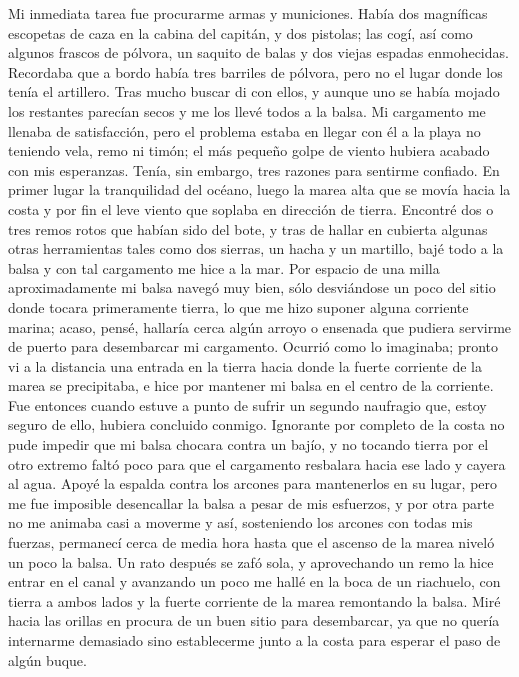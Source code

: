 \documentclass{novela}
\begin{document}
    Mi inmediata tarea fue procurarme armas y municiones. Había dos magníficas escopetas de caza en la cabina del capitán, y dos pistolas; las cogí, así como algunos frascos de pólvora, un saquito de balas y dos viejas espadas enmohecidas. Recordaba que a bordo había tres barriles de pólvora, pero no el lugar donde los tenía el artillero. Tras mucho buscar di con ellos, y aunque uno se había mojado los restantes parecían secos y me los llevé todos a la balsa. Mi cargamento me llenaba de satisfacción, pero el problema estaba en llegar con él a la playa no teniendo vela, remo ni timón; el más pequeño golpe de viento hubiera acabado con mis esperanzas. Tenía, sin embargo, tres razones para sentirme confiado. En primer lugar la tranquilidad del océano, luego la marea alta que se movía hacia la costa y por fin el leve viento que soplaba en dirección de tierra. Encontré dos o tres remos rotos que habían sido del bote, y tras de hallar en cubierta algunas otras herramientas tales como dos sierras, un hacha y un martillo, bajé todo a la balsa y con tal cargamento me hice a la mar. Por espacio de una milla aproximadamente mi balsa navegó muy bien, sólo desviándose un poco del sitio donde tocara primeramente tierra, lo que me hizo suponer alguna corriente marina; acaso, pensé, hallaría cerca algún arroyo o ensenada que pudiera servirme de puerto para desembarcar mi cargamento.
    Ocurrió como lo imaginaba; pronto vi a la distancia una entrada en la tierra hacia donde la fuerte corriente de la marea se precipitaba, e hice por mantener mi balsa en el centro de la corriente. Fue entonces cuando estuve a punto de sufrir un segundo naufragio que, estoy seguro de ello, hubiera concluido conmigo. Ignorante por completo de la costa no pude impedir que mi balsa chocara contra un bajío, y no tocando tierra por el otro extremo faltó poco para que el cargamento resbalara hacia ese lado y cayera al agua. Apoyé la espalda contra los arcones para mantenerlos en su lugar, pero me fue imposible desencallar la balsa a pesar de mis esfuerzos, y por otra parte no me animaba casi a moverme y así, sosteniendo los arcones con todas mis fuerzas, permanecí cerca de media hora hasta que el ascenso de la marea niveló un poco la balsa. Un rato después se zafó sola, y aprovechando un remo la hice entrar en el canal y avanzando un poco me hallé en la boca de un riachuelo, con tierra a ambos lados y la fuerte corriente de la marea remontando la balsa. Miré hacia las orillas en procura de un buen sitio para desembarcar, ya que no quería internarme demasiado sino establecerme junto a la costa para esperar el paso de algún buque.
\end{document}
